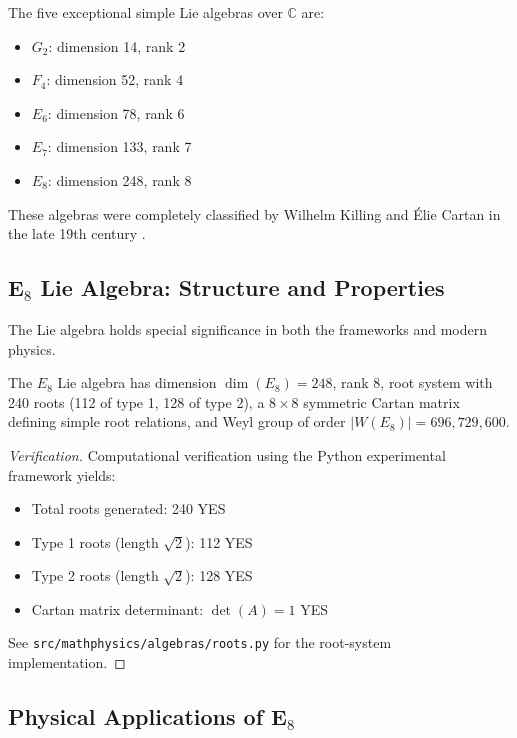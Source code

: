 \begin{definition}
The five exceptional simple Lie algebras over $\mathbb{C}$ are:
\begin{itemize}
    \item $G_2$: dimension 14, rank 2
    \item $F_4$: dimension 52, rank 4
    \item $E_6$: dimension 78, rank 6
    \item $E_7$: dimension 133, rank 7
    \item $E_8$: dimension 248, rank 8
\end{itemize}
\end{definition}

These algebras were completely classified by Wilhelm Killing and Élie Cartan in the late 19th century \cite{kac1990infinite}.

\subsection{E$_8$ Lie Algebra: Structure and Properties}

The  Lie algebra holds special significance in both the frameworks and modern physics.

\begin{theorem}
The $E_8$ Lie algebra has dimension $\dim(E_8) = 248$, rank 8, root system with 240 roots (112 of type 1, 128 of type 2), a $8 \times 8$ symmetric Cartan matrix defining simple root relations, and Weyl group of order $|W(E_8)| = 696,729,600$.
\end{theorem}

\begin{proof}[Verification]
Computational verification using the Python experimental framework yields:
\begin{itemize}
    \item Total roots generated: 240 YES
    \item Type 1 roots (length $\sqrt{2}$): 112 YES
    \item Type 2 roots (length $\sqrt{2}$): 128 YES
    \item Cartan matrix determinant: $\det(A) = 1$ YES
\end{itemize}
See \texttt{src/mathphysics/algebras/roots.py} for the root-system implementation.
\end{proof}

\subsection{Physical Applications of E$_8$}

